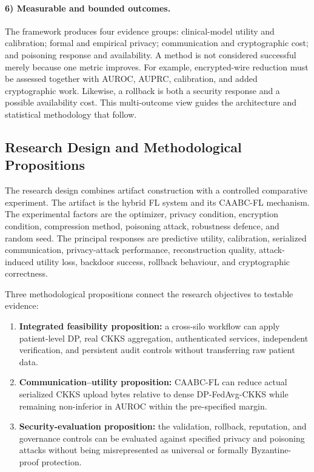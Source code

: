\paragraph{6) Measurable and bounded outcomes.}
The framework produces four evidence groups: clinical-model utility and calibration; formal and empirical privacy; communication and cryptographic cost; and poisoning response and availability. A method is not considered successful merely because one metric improves. For example, encrypted-wire reduction must be assessed together with AUROC, AUPRC, calibration, and added cryptographic work. Likewise, a rollback is both a security response and a possible availability cost. This multi-outcome view guides the architecture and statistical methodology that follow.

\subsection{Research Design and Methodological Propositions}
\label{subsec:research-design}

The research design combines artifact construction with a controlled comparative experiment. The artifact is the hybrid FL system and its CAABC-FL mechanism. The experimental factors are the optimizer, privacy condition, encryption condition, compression method, poisoning attack, robustness defence, and random seed. The principal responses are predictive utility, calibration, serialized communication, privacy-attack performance, reconstruction quality, attack-induced utility loss, backdoor success, rollback behaviour, and cryptographic correctness.

Three methodological propositions connect the research objectives to testable evidence:

\begin{enumerate}
    \item \textbf{Integrated feasibility proposition:} a cross-silo workflow can apply patient-level DP, real CKKS aggregation, authenticated services, independent verification, and persistent audit controls without transferring raw patient data.
    \item \textbf{Communication--utility proposition:} CAABC-FL can reduce actual serialized CKKS upload bytes relative to dense DP-FedAvg-CKKS while remaining non-inferior in AUROC within the pre-specified margin.
    \item \textbf{Security-evaluation proposition:} the validation, rollback, reputation, and governance controls can be evaluated against specified privacy and poisoning attacks without being misrepresented as universal or formally Byzantine-proof protection.
\end{enumerate}

